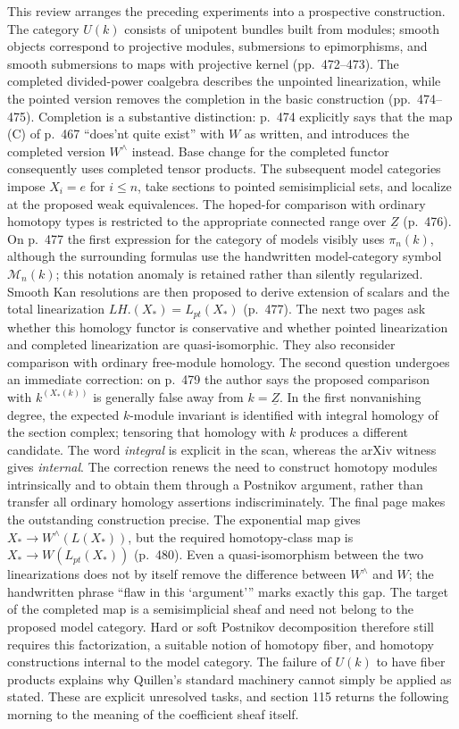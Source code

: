 \documentclass[10pt,oneside]{book}
\begin{document}
This review arranges the preceding experiments into a prospective construction. The category $U(k)$ consists of unipotent bundles built from modules; smooth objects correspond to projective modules, submersions to epimorphisms, and smooth submersions to maps with projective kernel (pp.~472--473). The completed divided-power coalgebra describes the unpointed linearization, while the pointed version removes the completion in the basic construction (pp.~474--475). Completion is a substantive distinction: p.~474 explicitly says that the map (C) of p.~467 ``does'nt quite exist'' with $W$ as written, and introduces the completed version $W^{\wedge}$ instead. Base change for the completed functor consequently uses completed tensor products. The subsequent model categories impose $X_i=e$ for $i\leq n$, take sections to pointed semisimplicial sets, and localize at the proposed weak equivalences. The hoped-for comparison with ordinary homotopy types is restricted to the appropriate connected range over $\underline Z$ (p.~476). On p.~477 the first expression for the category of models visibly uses $\pi_n(k)$, although the surrounding formulas use the handwritten model-category symbol $\mathcal M_n(k)$; this notation anomaly is retained rather than silently regularized. Smooth Kan resolutions are then proposed to derive extension of scalars and the total linearization $LH.(X_*)=L_{pt}(X_*)$ (p.~477). The next two pages ask whether this homology functor is conservative and whether pointed linearization and completed linearization are quasi-isomorphic. They also reconsider comparison with ordinary free-module homology. The second question undergoes an immediate correction: on p.~479 the author says the proposed comparison with $k^{(X_*(k))}$ is generally false away from $k=\underline Z$. In the first nonvanishing degree, the expected $k$-module invariant is identified with integral homology of the section complex; tensoring that homology with $k$ produces a different candidate. The word \emph{integral} is explicit in the scan, whereas the arXiv witness gives \emph{internal}. The correction renews the need to construct homotopy modules intrinsically and to obtain them through a Postnikov argument, rather than transfer all ordinary homology assertions indiscriminately. The final page makes the outstanding construction precise. The exponential map gives $X_*\to W^{\wedge}(L(X_*))$, but the required homotopy-class map is $X_*\to W(L_{pt}(X_*))$ (p.~480). Even a quasi-isomorphism between the two linearizations does not by itself remove the difference between $W^{\wedge}$ and $W$; the handwritten phrase ``flaw in this `argument''' marks exactly this gap. The target of the completed map is a semisimplicial sheaf and need not belong to the proposed model category. Hard or soft Postnikov decomposition therefore still requires this factorization, a suitable notion of homotopy fiber, and homotopy constructions internal to the model category. The failure of $U(k)$ to have fiber products explains why Quillen's standard machinery cannot simply be applied as stated. These are explicit unresolved tasks, and section 115 returns the following morning to the meaning of the coefficient sheaf itself.
\end{document}
